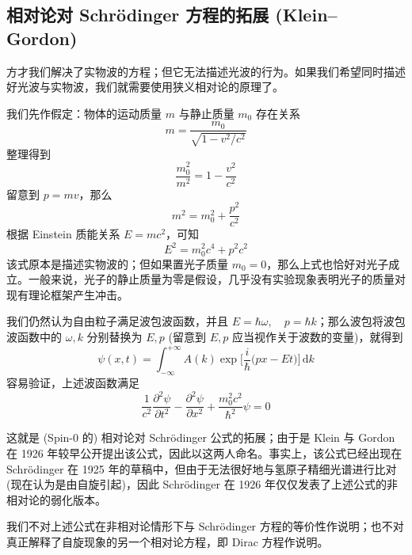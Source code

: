 \subsection{相对论对 Schr\"odinger 方程的拓展 (Klein–Gordon)}

方才我们解决了实物波的方程；但它无法描述光波的行为。如果我们希望同时描述好光波与实物波，我们就需要使用狭义相对论的原理了。

我们先作假定：物体的运动质量 $m$ 与静止质量 $m_0$ 存在关系
$$
m = \frac{m_0}{\sqrt{1 - v^2/c^2}}
$$
整理得到
$$
\frac{m_0^2}{m^2} = 1 - \frac{v^2}{c^2}
$$
留意到 $p = mv$，那么
$$
m^2 = m_0^2 + \frac{p^2}{c^2}
$$
根据 Einstein 质能关系 $E = m c^2$，可知
$$
E^2 = m_0^2 c^4 + p^2 c^2
$$
该式原本是描述实物波的；但如果置光子质量 $m_0 = 0$，那么上式也恰好对光子成立。一般来说，光子的静止质量为零是假设，几乎没有实验现象表明光子的质量对现有理论框架产生冲击。

我们仍然认为自由粒子满足波包波函数，并且 $E = \hbar \omega, \quad p = \hbar k$；那么波包将波包波函数中的 $\omega, k$ 分别替换为 $E, p$ (留意到 $E, p$ 应当视作关于波数的变量)，就得到
$$
\psi(x, t) = \int_{- \infty}^{+ \infty} A(k) \exp \big[ \frac{i}{\hbar} \big( p x - E t \big) \big] \, \mathrm{d} k
$$
容易验证，上述波函数满足
$$
\frac{1}{c^2} \frac{\partial^2 \psi}{\partial t^2} - \frac{\partial^2 \psi}{\partial x^2} + \frac{m_0^2 c^2}{\hbar^2} \psi = 0
$$

这就是 (Spin-0 的) 相对论对 Schr\"odinger 公式的拓展；由于是 Klein 与 Gordon 在 1926 年较早公开提出该公式，因此以这两人命名。事实上，该公式已经出现在 Schr\"odinger 在 1925 年的草稿中，但由于无法很好地与氢原子精细光谱进行比对 (现在认为是由自旋引起)，因此 Schr\"odinger 在 1926 年仅仅发表了上述公式的非相对论的弱化版本。

我们不对上述公式在非相对论情形下与 Schr\"odinger 方程的等价性作说明；也不对真正解释了自旋现象的另一个相对论方程，即 Dirac 方程作说明。

